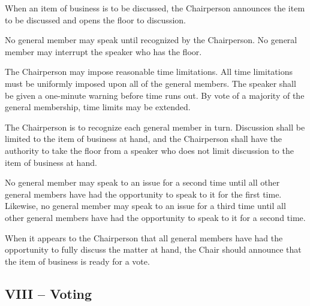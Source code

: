 \documentclass[12pt,a4paper]{article}
\begin{document}
\begin{constitutionlist}
\item When an item of business is to be discussed, the Chairperson announces the item to be discussed and opens the floor to discussion.

\item No general member may speak until recognized by the Chairperson. No general member may interrupt the speaker who has the floor.

\item The Chairperson may impose reasonable time limitations. All time limitations must be uniformly imposed upon all of the general members. The speaker shall be given a one-minute warning before time runs out. By vote of a majority of the general membership, time limits may be extended.

\item The Chairperson is to recognize each general member in turn. Discussion shall be limited to the item of business at hand, and the Chairperson shall have the authority to take the floor from a speaker who does not limit discussion to the item of business at hand.

\item No general member may speak to an issue for a second time until all other general members have had the opportunity to speak to it for the first time. Likewise, no general member may speak to an issue for a third time until all other general members have had the opportunity to speak to it for a second time.

\item When it appears to the Chairperson that all general members have had the opportunity to fully discuss the matter at hand, the Chair should announce that the item of business is ready for a vote.
\end{constitutionlist}

\subsection*{VIII – Voting}
\end{document}
